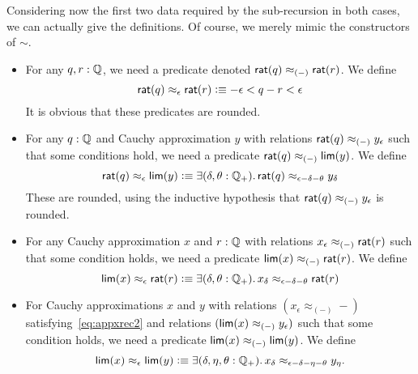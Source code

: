 Considering now the first two data required by the sub-recursion in both cases, we can actually give the definitions.
Of course, we merely mimic the constructors of $\sim$.
\begin{itemize}
\item For any $q,r:\mathbb{Q}$, we need a predicate denoted $\mathsf{rat}(q)\approx_{(-)} \mathsf{rat}(r)$.
  We define
  \begin{equation}
  \rcrat(q) \approx_\epsilon \rcrat(r)  \defeq
  -\epsilon < q - r < \epsilon\label{eq:appxratrat}
  \end{equation}
  It is obvious that these predicates are rounded.
\item For any $q:\mathbb{Q}$ and Cauchy approximation $y$ with relations $\mathsf{rat}(q) \approx_{(-)} y_\epsilon$ such that
  some conditions hold,
  we need a predicate $\mathsf{rat}(q)\approx_{(-)} \mathsf{lim}(y)$.
  We define
  \begin{equation}
  \rcrat(q) \approx_\epsilon \rclim(y) \defeq
  \exis{\delta, \theta : \Qp} \rcrat(q) \approx_{\epsilon - \delta - \theta} y_\delta\label{eq:appxratlim}
  \end{equation}
  These are rounded, using the inductive hypothesis that $\mathsf{rat}(q) \approx_{(-)} y_\epsilon$ is rounded.
\item For any Cauchy approximation $x$ and $r:\mathbb{Q}$ with relations $x_\epsilon \approx_{(-)} \mathsf{rat}(r)$ such that
  some condition holds,
  we need a predicate $\mathsf{lim}(x)\approx_{(-)} \mathsf{rat}(r)$.
  We define
  \begin{equation}
    \rclim(x) \approx_\epsilon \rcrat(r) \defeq
    \exis{\delta, \theta : \Qp} x_\delta \approx_{\epsilon - \delta - \theta} \rcrat(r)\label{eq:appxlimrat}
  \end{equation}
\item For Cauchy approximations $x$ and $y$ with relations $(x_\epsilon \approx_{(-)} -)$ satisfying~\eqref{eq:appxrec2} and relations $(\mathsf{lim}(x) \approx_{(-)} y_\epsilon)$ such that
  some condition holds,
  we need a predicate $\mathsf{lim}(x) \approx_{(-)} \mathsf{lim}(y)$.
  We define
  \begin{equation}\label{eq:appxlimlim}
    \rclim(x) \approx_\epsilon \rclim(y) \defeq
    \exis{\delta, \eta, \theta : \Qp} x_\delta \approx_{\epsilon - \delta - \eta - \theta} y_\eta.
  \end{equation}  
\end{itemize}
